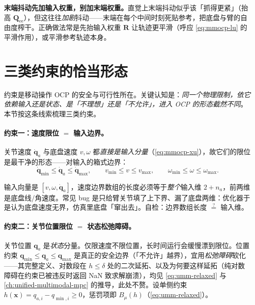 \begin{insight}
\textbf{末端抖动先加输入权重，别加末端权重。}\;直觉上末端抖动似乎该「抓得更紧」（抬高 $\mathbf Q_{\text{ee}}$），但这往往\emph{加剧}抖动——末端在每个中间时刻死贴参考，把底盘与臂的自由度榨干。正确做法常是先抬输入权重 $\mathbf R$ 让轨迹更平滑（呼应 \cref{eq:mmocp-lu} 的平滑作用），或平滑参考轨迹本身。
\end{insight}

\section{三类约束的恰当形态}
\label{sec:mmocp-constraint}

约束是移动操作 OCP 的安全与可行性所在。关键认知是：\emph{同一个物理限制，依它依赖输入还是状态、是「不理想」还是「不允许」，进入 OCP 的形态截然不同}。本节按这条线索梳理三类约束。

\paragraph{约束一：速度限位 $=$ 输入边界。}
关节速度 $\dot{\mathbf q}_a$ 与底盘速度 $v,\omega$ 都\emph{直接是输入分量}（\cref{eq:mmocp-xu}），故它们的限位是最干净的形态——对输入的箱式边界：
\begin{equation}
  \dot{\mathbf q}_{\min}\le\dot{\mathbf q}_a\le\dot{\mathbf q}_{\max},\qquad
  v_{\min}\le v\le v_{\max},\qquad
  \omega_{\min}\le\omega\le\omega_{\max}.
  \label{eq:mmocp-vlim}
\end{equation}

\begin{pitfall}[别漏掉底盘那两维]
输入向量是 $[v,\omega,\dot{\mathbf q}_a]$，速度边界数组的长度必须等于\emph{整个}输入维 $2+n_a$，前两维是底盘线/角速度。常见 bug 是只给臂关节填了上下界、漏了底盘两维：优化器于是认为底盘速度无界，仿真里底盘「窜出去」。自检：边界数组长度 $\overset{?}{=}$ 输入维。
\end{pitfall}

\paragraph{约束二：关节位置限位 $=$ 状态松弛障碍。}
关节位置 $\mathbf q_a$ 是\emph{状态}分量。仅限速度不限位置，长时间运行会缓慢漂到限位。位置约束 $\mathbf q_{\min}\le\mathbf q_a\le\mathbf q_{\max}$ 是真正的安全边界（「不允许」越界），宜用\emph{松弛障碍}软化——其完整定义、对数段在 $h\le\delta$ 处的二次延拓、以及为何要这样延拓（纯对数障碍在约束已被违反时返回 NaN 致求解崩溃），均见 \cref{eq:umm-relaxed} 与 \cref{ch:unified-multimodal-mpc} 的推导，此处不赘。设单侧约束 $h(\mathbf x)=q_{a,i}-q_{\min,i}\ge0$，惩罚项即 $B_\mu(h)$（\cref{eq:umm-relaxed}）。

